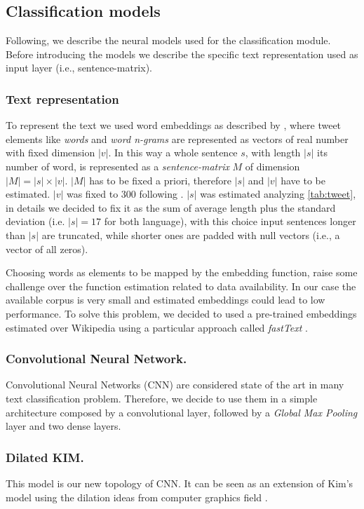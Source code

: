 \subsection{Classification models} \label{subsec:classificationModel}
Following, we describe the neural models used for the classification module. Before introducing the models we describe the specific text representation used as input layer  (i.e., sentence-matrix).

\subsubsection{Text representation} \label{subsubsec:representation}
To represent the text we used word embeddings as described by \cite{bojanowski2016enriching}, where tweet elements like \emph{words} and \emph{word n-grams} are represented as vectors of real number with fixed dimension $|v|$.
In this way a whole sentence $s$, with length $|s|$ its number of word, is represented as a \emph{sentence-matrix} $M$ of dimension $|M| = |s| \times |v|$. $|M|$ has to be fixed a priori, therefore $|s|$ and $|v|$ have to be estimated. $|v|$ was fixed to 300 following \cite{bojanowski2016enriching}. $|s|$ was estimated analyzing \cref{tab:tweet}, in details we decided to fix it as the sum of average length plus the standard deviation (i.e. $|s| = 17$ for both language), with this choice input sentences longer than $|s|$ are truncated, while shorter ones are padded with null vectors (i.e., a vector of all zeros).

Choosing words as elements to be mapped by the embedding function, raise some challenge over the function estimation related to data availability. In our case the available corpus is very small and estimated embeddings could lead to low performance.
To solve this problem, we decided to used a pre-trained embeddings estimated over Wikipedia using a particular approach called \emph{fastText} \cite{bojanowski2016enriching}.


\subsubsection{Convolutional Neural Network.}
Convolutional Neural Networks (CNN) are considered state of the art in many text classification problem. Therefore, we decide to use them in a simple architecture composed by a convolutional layer, followed by a \emph{Global Max Pooling} layer and two dense layers.

\subsubsection{Dilated KIM.}
This model is our new topology of CNN. It can be seen as an extension of Kim's model \cite{kim2014convolutional} using the dilation ideas from computer graphics field \cite{yu2015multi}.

